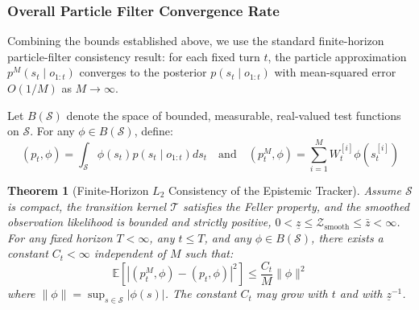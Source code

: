 \documentclass[11pt,a4paper]{report}
\newtheorem{theorem}{Theorem}
\begin{document}
\subsubsection{Overall Particle Filter Convergence Rate}
Combining the bounds established above, we use the standard finite-horizon particle-filter consistency result: for each fixed turn $t$, the particle approximation $p^M(s_t \mid o_{1:t})$ converges to the posterior $p(s_t \mid o_{1:t})$ with mean-squared error $O(1/M)$ as $M \to \infty$.

Let $B(\mathcal{S})$ denote the space of bounded, measurable, real-valued test functions on $\mathcal{S}$. For any $\phi \in B(\mathcal{S})$, define:
\begin{equation}
    (p_t, \phi) = \int_{\mathcal{S}} \phi(s_t) p(s_t \mid o_{1:t}) ds_t \quad \text{and} \quad (p_t^M, \phi) = \sum_{i=1}^M W_t^{[i]} \phi(s_t^{[i]})
\end{equation}

\begin{theorem}[Finite-Horizon $L_2$ Consistency of the Epistemic Tracker]
Assume $\mathcal{S}$ is compact, the transition kernel $\mathcal{T}$ satisfies the Feller property, and the smoothed observation likelihood is bounded and strictly positive, $0<\underline{z}\le \mathcal{Z}_{\text{smooth}}\le\bar{z}<\infty$. For any fixed horizon $T<\infty$, any $t\le T$, and any $\phi\in B(\mathcal{S})$, there exists a constant $C_t<\infty$ independent of $M$ such that:
\begin{equation}
    \mathbb{E}\left[ \left| (p_t^M, \phi) - (p_t, \phi) \right|^2 \right] \le \frac{C_t}{M} \parallel \phi \parallel^2
\end{equation}
where $\parallel \phi \parallel = \sup_{s \in \mathcal{S}} |\phi(s)|$. The constant $C_t$ may grow with $t$ and with $\underline{z}^{-1}$.
\end{theorem}
\end{document}
